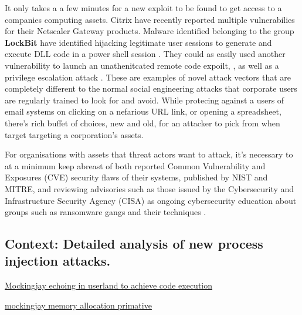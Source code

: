 \documentclass{article}
\begin{document}
It only takes a a few minutes for a new exploit to be found to get access to a companies computing assets.  Citrix have recently reported multiple
vulnerabilies for their Netscaler Gateway products.  Malware identified belonging to the group \textbf{LockBit} have identified hijacking legitimate user sessions to generate and execute DLL code in a power shell session \autocite{CISA:2023a}.  They could as easily used another vulnerability to launch an unathenitcated remote code expoilt, \autocite{CVE-2023-3519}, as well as a privilege escalation attack \autocite{CVE-2023-3467}.  These are examples of novel attack vectors that  are completely different to the normal social engineering attacks that corporate users are regularly trained to look for and avoid.  While protecing against a users of  email systems on clicking on a nefarious URL link, or opening a spreadsheet, there's rich buffet of choices, new and old, for an attacker to pick from when target targeting a corporation's assets.

For organisations with assets that threat actors want to attack, it's necessary to at a minimum keep abreast of both reported Common Vulnerability and Exposures (CVE)
security flaws of their systems, published by NIST and MITRE, and reviewing advisories such as those issued by the Cybersecurity and Infrastructure Security Agency (CISA)
as ongoing cybersecurity education about groups such as ransomware gangs and their techniques \autocite{CISA:2023}.


\subsection{Context: Detailed analysis of new process injection attacks.}


\href{https://www.securityjoes.com/post/process-mockingjay-echoing-rwx-in-userland-to-achieve-code-execution}{Mockingjay echoing in userland to achieve code execution}

\href{https://www.linkedin.com/posts/john-stigerwalt-90a9b4110_mockingjay-memory-allocation-primitive-activity-7083050050158743552-Hgyw}{mockingjay memory allocation primative}
\end{document}
